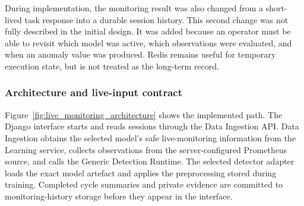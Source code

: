 During implementation, the monitoring result was also changed from a short-lived task response into a durable session history. This second change was not fully described in the initial design. It was added because an operator must be able to revisit which model was active, which observations were evaluated, and when an anomaly value was produced. Redis remains useful for temporary execution state, but is not treated as the long-term record.

\subsubsection{Architecture and live-input contract}

Figure~\ref{fig:live_monitoring_architecture} shows the implemented path. The Django interface starts and reads sessions through the Data Ingestion API. Data Ingestion obtains the selected model's safe live-monitoring information from the Learning service, collects observations from the server-configured Prometheus source, and calls the Generic Detection Runtime. The selected detector adapter loads the exact model artefact and applies the preprocessing stored during training. Completed cycle summaries and private evidence are committed to monitoring-history storage before they appear in the interface.

